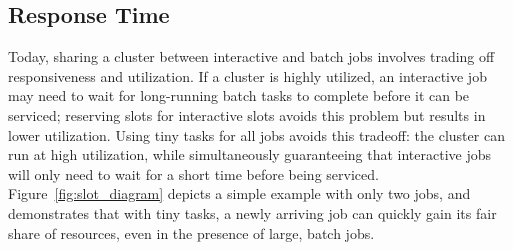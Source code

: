 \subsection{Response Time}
Today, sharing a cluster between interactive and batch jobs involves trading off
responsiveness and utilization. If a cluster is highly utilized,
an interactive job may need to wait for long-running batch tasks to
complete before it can be serviced; reserving slots for
interactive slots avoids this problem but results in lower utilization.
Using tiny tasks for all jobs avoids this tradeoff: the cluster can run at
high utilization, while
simultaneously guaranteeing that interactive jobs will only need to wait for
a short time before being serviced. Figure~\ref{fig:slot_diagram} depicts a simple example
with only two jobs, and demonstrates that with tiny tasks, a newly arriving
job can quickly gain its fair share of resources, even in the presence
of large, batch jobs.

